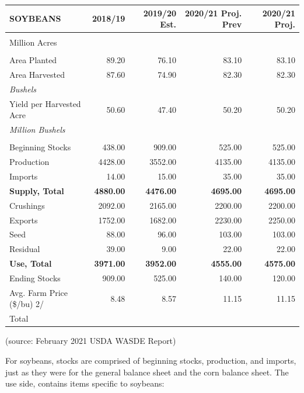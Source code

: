 \documentclass[
]{book}
\begin{document}
\begin{table}
\centering
\begin{tabular}{l|r|r|r|r}
\hline
SOYBEANS & 2018/19 & 2019/20 Est. & 2020/21 Proj. Prev & 2020/21 Proj.\\
\hline
\textbf{} & \textbf{} & \textbf{} & \textbf{ \vphantom{2}} & \textbf{}\\
\hline
Million Acres &  &  &  \vphantom{1} & \\
\hline
 &  &  &  & \\
\hline
Area Planted & 89.20 & 76.10 & 83.10 & 83.10\\
\hline
Area Harvested & 87.60 & 74.90 & 82.30 & 82.30\\
\hline
\em{Bushels} & \em{} & \em{} & \em{} & \em{}\\
\hline
Yield per Harvested Acre & 50.60 & 47.40 & 50.20 & 50.20\\
\hline
\em{Million Bushels} & \em{} & \em{} & \em{} & \em{}\\
\hline
 &  &  &  & \\
\hline
Beginning Stocks & 438.00 & 909.00 & 525.00 & 525.00\\
\hline
Production & 4428.00 & 3552.00 & 4135.00 & 4135.00\\
\hline
Imports & 14.00 & 15.00 & 35.00 & 35.00\\
\hline
\textbf{Supply, Total} & \textbf{4880.00} & \textbf{4476.00} & \textbf{4695.00} & \textbf{4695.00}\\
\hline
Crushings & 2092.00 & 2165.00 & 2200.00 & 2200.00\\
\hline
Exports & 1752.00 & 1682.00 & 2230.00 & 2250.00\\
\hline
Seed & 88.00 & 96.00 & 103.00 & 103.00\\
\hline
Residual & 39.00 & 9.00 & 22.00 & 22.00\\
\hline
\textbf{Use, Total} & \textbf{3971.00} & \textbf{3952.00} & \textbf{4555.00} & \textbf{4575.00}\\
\hline
Ending Stocks & 909.00 & 525.00 & 140.00 & 120.00\\
\hline
Avg. Farm Price (\$/bu)  2/ & 8.48 & 8.57 & 11.15 & 11.15\\
\hline
Total &  &  &  & \\
\hline
\end{tabular}
\end{table}

(source: February 2021 USDA WASDE Report)

For soybeans, stocks are comprised of beginning stocks, production, and imports, just as they were for the general balance sheet and the corn balance sheet. The use side, contains items specific to soybeans:
\end{document}
